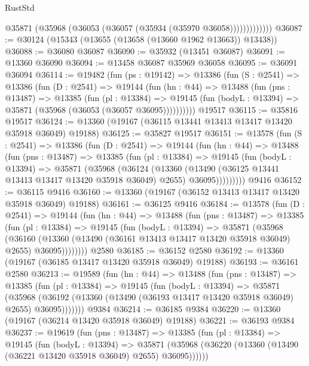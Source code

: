 \begin{lexlean}{RustStd}
\begin{coremodule}
                  @35871 (@35968 (@36053 (@36057 (@35934 (@35970 @36058)))))))))))))
@36087 := @30124 (@15343 (@13655 (@13658 (@13660 @1962 @13663)) @13438))
@36088 := @36080 @36087
@36090 := @35932 (@13451 @36087)
@36091 := @13360 @36090
@36094 := @13458 @36087 @35969 @36058
@36095 := @36091 @36094
@36114 := @19482
    (fun (ps : @19142) =>
    @13386
      (fun (S : @2541) =>
      @13386
        (fun (D : @2541) =>
        @19144
          (fun (hn : @44) =>
          @13488
            (fun (pns : @13487) =>
            @13385
              (fun (pl : @13384) =>
              @19145 (fun (bodyL : @13394) => @35871 (@35968 (@36053 (@36057 @36095))))))))))
    @19517
@36115 := @35816 @19517
@36124 := @13360 (@19167 (@36115 @13441 @13413 @13417 @13420 @35918 @36049) @19188)
@36125 := @35827 @19517
@36151 := @13578
    (fun (S : @2541) =>
    @13386
      (fun (D : @2541) =>
      @19144
        (fun (hn : @44) =>
        @13488
          (fun (pns : @13487) =>
          @13385
            (fun (pl : @13384) =>
            @19145
              (fun (bodyL : @13394) =>
              @35871
                (@35968
                  (@36124
                    (@13360
                      (@13490 (@36125 @13441 @13413 @13417 @13420 @35918 @36049) @2655)
                      @36095)))))))))
    @9416
@36152 := @36115 @9416
@36160 := @13360 (@19167 (@36152 @13413 @13417 @13420 @35918 @36049) @19188)
@36161 := @36125 @9416
@36184 := @13578
    (fun (D : @2541) =>
    @19144
      (fun (hn : @44) =>
      @13488
        (fun (pns : @13487) =>
        @13385
          (fun (pl : @13384) =>
          @19145
            (fun (bodyL : @13394) =>
            @35871
              (@35968
                (@36160
                  (@13360 (@13490 (@36161 @13413 @13417 @13420 @35918 @36049) @2655) @36095))))))))
    @2580
@36185 := @36152 @2580
@36192 := @13360 (@19167 (@36185 @13417 @13420 @35918 @36049) @19188)
@36193 := @36161 @2580
@36213 := @19589
    (fun (hn : @44) =>
    @13488
      (fun (pns : @13487) =>
      @13385
        (fun (pl : @13384) =>
        @19145
          (fun (bodyL : @13394) =>
          @35871
            (@35968
              (@36192 (@13360 (@13490 (@36193 @13417 @13420 @35918 @36049) @2655) @36095)))))))
    @9384
@36214 := @36185 @9384
@36220 := @13360 (@19167 (@36214 @13420 @35918 @36049) @19188)
@36221 := @36193 @9384
@36237 := @19619
    (fun (pns : @13487) =>
    @13385
      (fun (pl : @13384) =>
      @19145
        (fun (bodyL : @13394) =>
        @35871 (@35968 (@36220 (@13360 (@13490 (@36221 @13420 @35918 @36049) @2655) @36095))))))

\end{coremodule}
\end{lexlean}
